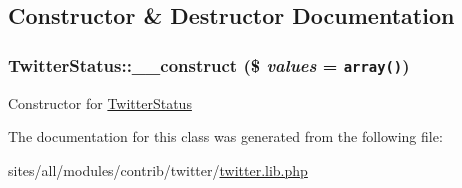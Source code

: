 \subsection{Constructor \& Destructor Documentation}
\hypertarget{classTwitterStatus_0a3ca3eab02c0f1444e27d33cdbfd8f5}{
\subsubsection[{\_\-\_\-construct}]{\setlength{\rightskip}{0pt plus 5cm}TwitterStatus::\_\-\_\-construct (\$ {\em values} = {\tt array()})}}
\label{classTwitterStatus_0a3ca3eab02c0f1444e27d33cdbfd8f5}


Constructor for \hyperlink{classTwitterStatus}{TwitterStatus} 

The documentation for this class was generated from the following file:\begin{CompactItemize}
\item 
sites/all/modules/contrib/twitter/\hyperlink{twitter_8lib_8php}{twitter.lib.php}\end{CompactItemize}
